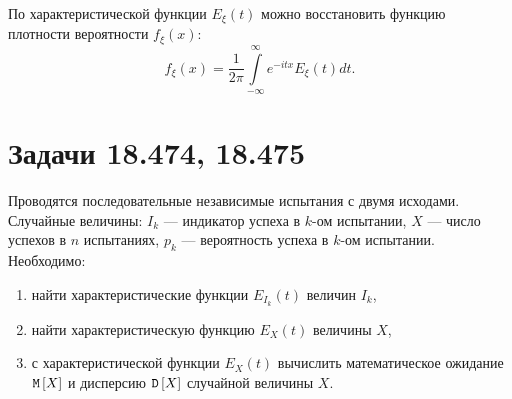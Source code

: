 По характеристической функции $E_\xi(t)$ можно восстановить функцию плотности вероятности $f_\xi(x)$:
\begin{equation}
    f_\xi(x) = \frac{1}{2 \pi} \int \limits_{-\infty}^\infty e^{-i t x} E_\xi(t) dt .
\end{equation}

\begin{comment}
    \section*{Задача 18.472}

    Случайная величина $X$ дискретного типа может принимать только два возможных значения -1 и 1, с равными вероятностями. Вычислить характеристическую функцию данного распределения.

    \subsection*{Решение:}

    По определению характеристическая функция $E_X(t)$ случайной величины $X$ имеет вид:
    \begin{multline}
        E_X(t)
        = e^{it \cdot (-1)} \probability{X = -1} + e^{it \cdot 1} \probability{X = 1}
        = e^{-it} \frac{1}{2} + e^{it} \frac{1}{2}
        = \frac{e^{-it} + e^{it}}{2} = \\
        = \frac{\cos t - i \sin t + \cos t + i \sin t}{2}
        = \frac{\cos t + \cos t}{2}
        = \cos t.
    \end{multline}

    \subsection*{Ответ:}
    $\cos t$.
\end{comment}

\section*{Задачи 18.474, 18.475}

Проводятся последовательные независимые испытания с двумя исходами. Случайные величины: $I_k$ --- индикатор успеха в $k$-ом испытании, $X$ --- число успехов в $n$ испытаниях,
$p_k$ --- вероятность успеха в $k$-ом испытании. Необходимо:
\begin{enumerate}
    \item найти характеристические функции $E_{I_k}(t)$ величин $I_k$,
    \item найти характеристическую функцию $E_X(t)$ величины $X$,
    \item с характеристической функции $E_X(t)$ вычислить математическое ожидание $\mathtt{M} \left [ X \right ]$ и дисперсию $\mathtt{D} \left [ X \right ]$ случайной величины $X$.
\end{enumerate}

